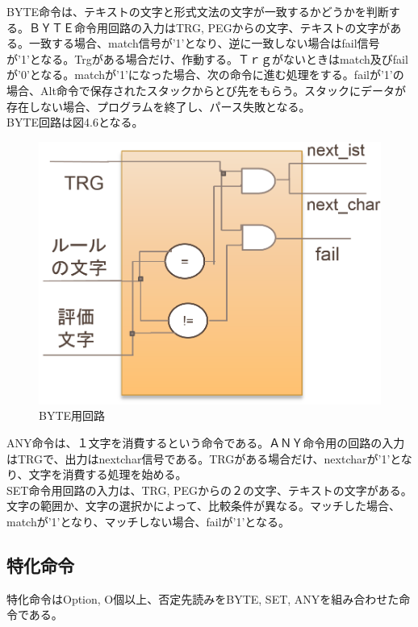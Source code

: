 \documentclass[12pt,oneside]{report}
\begin{document}
BYTE命令は、テキストの文字と形式文法の文字が一致するかどうかを判断する。ＢＹＴＥ命令用回路の入力はTRG, PEGからの文字、テキストの文字がある。一致する場合、match信号が'1'となり、逆に一致しない場合はfail信号が'1'となる。Trgがある場合だけ、作動する。Ｔｒｇがないときはmatch及びfailが'0'となる。matchが'1'になった場合、次の命令に進む処理をする。failが'1'の場合、Alt命令で保存されたスタックからとび先をもらう。スタックにデータが存在しない場合、プログラムを終了し、パース失敗となる。\\
BYTE回路は図4.6となる。\\
\begin{figure}[t]
    \begin{center}
        \includegraphics[width=130mm]{./fig/byte.png}
       \caption{BYTE用回路}
        \label{fig:byte}
    \end{center}
\end{figure}


ANY命令は、１文字を消費するという命令である。ＡＮＹ命令用の回路の入力はTRGで、出力はnextchar信号である。TRGがある場合だけ、nextcharが'1'となり、文字を消費する処理を始める。\\

SET命令用回路の入力は、TRG, PEGからの２の文字、テキストの文字がある。文字の範囲か、文字の選択かによって、比較条件が異なる。マッチした場合、matchが'1'となり、マッチしない場合、failが'1'となる。\\


\subsection{特化命令}
特化命令はOption, O個以上、否定先読みをBYTE, SET, ANYを組み合わせた命令である。
\end{document}
